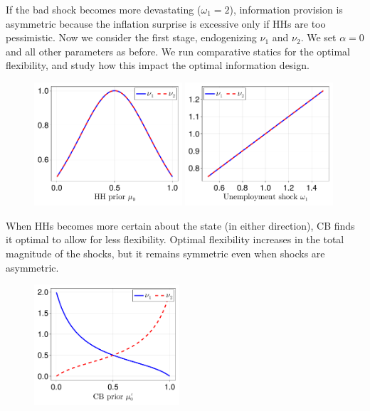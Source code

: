 \documentclass{beamer}
\begin{document}
\begin{frame}[allowframebreaks]
\begin{figure}[htp!]
    \end{figure}
    If the bad shock becomes more devastating ($\omega_1=2$), information provision is asymmetric because the inflation surprise is excessive only if HHs are too pessimistic.
    \vskip10pt
    \framebreak
    Now we consider the first stage, endogenizing $\nu_1$ and $\nu_2$.
    \vskip10pt
    We set $\alpha=0$ and all other parameters as before.
    \vskip10pt
    We run comparative statics for the optimal flexibility, and study how this impact the optimal information design.
    \vskip10pt
    \framebreak
    \begin{figure}[H]
    \centering
    \includegraphics[width=0.49\textwidth]{figures/V9/γ=1.0-μ_0=0.5-α=0.0/fig_optimal_ν_by_μ_0.pdf}
    \includegraphics[width=0.49\textwidth]{figures/V9/γ=1.0-μ_0=0.5-α=0.0/fig_optimal_ν_by_ω_1.pdf}
    \end{figure}
    When HHs becomes more certain about the state (in either direction), CB finds it optimal
    to allow for less flexibility.
    \vskip10pt
    Optimal flexibility increases in the total magnitude of the shocks, but it remains symmetric even when shocks are asymmetric.
    \vskip10pt
    \framebreak
    \begin{figure}[H]
    \centering
    \includegraphics[width=0.48\textwidth]{figures/V9/γ_1/fig_optimal_ν_μ_0_c.pdf}

\end{figure}
\end{frame}
\end{document}
